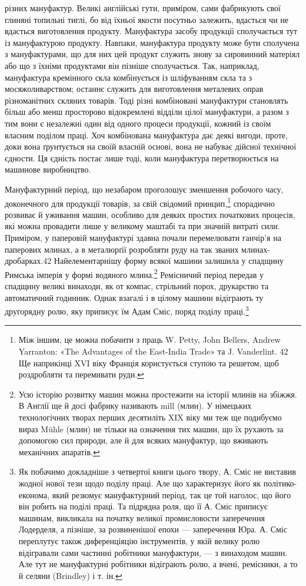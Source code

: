 різних мануфактур. Великі англійські гути, приміром, сами
фабрикують свої глиняні топильні тиглі, бо від їхньої якости
посутньо залежить, вдасться чи не вдасться виготовлення продукту.
Мануфактура засобу продукції сполучається тут із мануфактурою
продукту. Навпаки, мануфактура продукту може бути
сполучена з мануфактурами, що для них цей продукт служить
знову за сировинний матеріял або що з їхніми продуктами він
пізніше сполучається. Так, наприклад, мануфактура кремінного
скла комбінується із шліфуванням скла та з мосяжоливарством;
останнє служить для виготовлення металевих оправ різноманітних
скляних товарів. Тоді різні комбіновані мануфактури
становлять більш або менш просторово відокремлені відділи цілої
мануфактури, а разом з тим вони є незалежні один від одного
процеси продукції, кожний із своїм власним поділом праці. Хоч
комбінована мануфактура дає деякі вигоди, проте, доки вона
ґрунтується на своїй власній основі, вона не набуває дійсної
технічної єдности. Ця єдність постає лише тоді, коли мануфактура
перетворюється на машинове виробництво.

Мануфактурний період, що незабаром проголошує зменшення
робочого часу, доконечного для продукції товарів, за свій свідомий
принцип,\footnote{
Між іншим, це можна побачити з праць W. Petty, John Bellers,
Andrew Yarranton: «The Advantages of the East-India Trade» та J. Vanderlint.
42    Ще наприкінці XVI віку Франція користується ступою та решетом,
щоб роздробляти та перемивати руди.
} спорадично розвиває й уживання машин, особливо
для деяких простих початкових процесів, які можна провадити
лише у великому маштабі та при значній витраті сили. Приміром,
у паперовій мануфактурі здавна почали перемелювати ганчір’я
на паперових млинах, а в металюрґії розробляти руду на так
званих млинах-дробарках.42 Найелементарнішу форму всякої
машини залишила у спадщину Римська імперія у формі водяного
млина.\footnote{
Усю історію розвитку машин можна простежити на історії млинів
на збіжжя. В Англії ще й досі фабрику називають mill (млин). У
німецьких технологічних творах перших десятиліть XIX віку ми теж
ще подибуємо вираз Mühle (млин) не тільки на означення тих машин,
що їх рухають за допомогою сил природи, але й для всяких мануфактур,
що вживають механічних апаратів.
} Ремісничий період передав у спадщину великі винаходи,
як от компас, стрільний порох, друкарство та автоматичний
годинник. Однак взагалі і в цілому машини відіграють ту другорядну
ролю, яку приписує їм Адам Сміс, поряд поділу праці.\footnote{
Як побачимо докладніше з четвертої книги цього твору, А. Сміс
не виставив жодної нової тези щодо поділу праці. Але що характеризує
його як політико-економа, який резюмує мануфактурний період, так
це той наголос, що його він робить на поділі праці. Та підрядна роля,
що її А. Сміс приписує машинам, викликала на початку великої промисловости
заперечення Лодерделя, а пізніше, за розвиненішої епохи —
заперечення Юра. А. Сміс переплутує також диференціяцію інструментів,
у якій велику ролю відігравали сами частинні робітники мануфактури,
— з винаходом машин. Але тут не мануфактурні робітники
відіграють ролю, а вчені, ремісники, а то й селяни (Brindley) і т. ін.
}